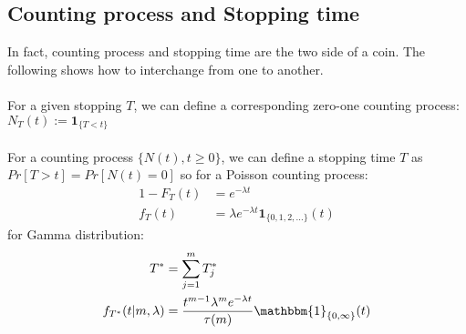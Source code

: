 \documentclass[../Distributions.tex]{subfiles}
\begin{document}
\subsection{Counting process and Stopping time}
In fact, counting process and stopping time are the two side of a coin. The following shows how to interchange from one to another.\\

\\
For a given stopping $T$, we can define a corresponding zero-one counting process: $N_T(t) := \mathbf{1}_{\{T<t \}}$\\

\\
For a counting process $\{N(t),t\geq0\}$, we can define a stopping time $T$ as $Pr[T>t] = Pr[N(t)=0]$ so for a Poisson counting process:
\begin{align*}
1-F_{T}(t) &= e^{-\lambda t}\\
f_T(t)&=\lambda e^{-\lambda t}\mathbf{1}_{\{0,1,2,...\}}(t)
\end{align*}
for Gamma distribution:
\begin{align*}
T^*&=\sum_{j=1}^mT_j^*\\
f_{T^*}(t|m,\lambda)&=\frac{t^{m-1}\lambda^m e^{-\lambda t}}{\tau(m)}\mathbbm{1}_{\{0,\infty\}}(t)
\end{align*}
\end{document}
